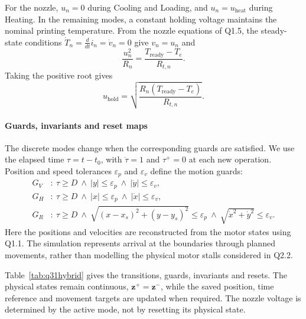 \documentclass[a4paper,12pt]{article}
\begin{document}
For the nozzle, $u_n=0$ during Cooling and Loading, and $u_n=u_{\mathrm{heat}}$ during Heating. In the remaining modes, a constant holding voltage maintains the nominal printing temperature. From the nozzle equations of Q1.5, the steady-state conditions $\dot T_n=\frac{d}{dt} i_n=\dot v_n=0$ give $v_n=u_n$ and
\begin{equation}
\frac{u_n^2}{R_n}=\frac{T_{\mathrm{ready}}-T_e}{R_{t,n}}.
\end{equation}
Taking the positive root gives
\begin{equation}
\boxed{u_{\mathrm{hold}}=\sqrt{\frac{R_n(T_{\mathrm{ready}}-T_e)}{R_{t,n}}}.}
\end{equation}

\paragraph{Guards, invariants and reset maps}
The discrete modes change when the corresponding guards are satisfied. We use the elapsed time $\tau=t-t_0$, with $\dot\tau=1$ and $\tau^+=0$ at each new operation. Position and speed tolerances $\varepsilon_p$ and $\varepsilon_v$ define the motion guards:
\begin{equation}
\begin{aligned}
G_V&:\ \tau\geq D\ \land\ |y|\leq\varepsilon_p\ \land\ |\dot y|\leq\varepsilon_v,\\
G_H&:\ \tau\geq D\ \land\ |x|\leq\varepsilon_p\ \land\ |\dot x|\leq\varepsilon_v,\\
G_R&:\ \tau\geq D\ \land\
\sqrt{(x-x_s)^2+(y-y_s)^2}\leq\varepsilon_p\ \land\
\sqrt{\dot x^2+\dot y^2}\leq\varepsilon_v.
\end{aligned}
\end{equation}
Here the positions and velocities are reconstructed from the motor states using Q1.1. The simulation represents arrival at the boundaries through planned movements, rather than modelling the physical motor stalls considered in Q2.2.

Table~\ref{tab:q31hybrid} gives the transitions, guards, invariants and resets. The physical states remain continuous, $\mathbf z^+=\mathbf z^-$, while the saved position, time reference and movement targets are updated when required. The nozzle voltage is determined by the active mode, not by resetting its physical state.
\end{document}
